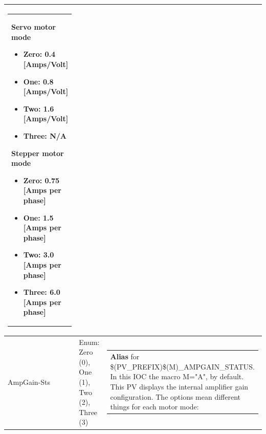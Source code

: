 \documentclass[openany]{article}
\begin{document}
\begin{longtable}{| m{4.5cm} m{2.5cm}  m{8.5cm} |}
\begin{tabular}{@{}m{6cm}@{}}
                Servo motor mode
                \begin{itemize}
                    \item Zero: 0.4 [Amps/Volt]
                    \item One: 0.8 [Amps/Volt]
                    \item Two: 1.6 [Amps/Volt]
                    \item Three: N/A
                \end{itemize}
                Stepper motor mode
                \begin{itemize}
                    \item Zero: 0.75 [Amps per phase]
                    \item One: 1.5 [Amps per phase]
                    \item Two: 3.0 [Amps per phase]
                    \item Three: 6.0 [Amps per phase]
                \end{itemize}
            \end{tabular} \hypertarget{}{}\\ \hline
        AmpGain-Sts & Enum: Zero (0), One (1), Two (2), Three (3) & \begin{tabular}{@{}m{6cm}@{}}
                \textbf{\color{blue} Alias} for \$(PV\_PREFIX)\$(M)\_AMPGAIN\_STATUS. In this IOC the macro M="A", by default. This PV displays the internal amplifier gain configuration. The options mean different things for each motor mode:


\end{tabular}
\end{longtable}
\end{document}
